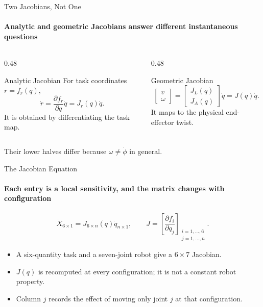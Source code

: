 \documentclass[aspectratio=169]{beamer}
\begin{document}
\begin{frame}[t]{Two Jacobians, Not One}
    \framesubtitle{Analytic and geometric Jacobians answer different instantaneous questions}
    \begin{columns}[T,onlytextwidth]
        \begin{column}{0.48\textwidth}
            \begin{block}{Analytic Jacobian}
                For task coordinates $r=f_r(q)$,
                \[
                    \dot r=\frac{\partial f_r}{\partial q}\dot q
                    =J_r(q)\dot q.
                \]
                It is obtained by differentiating the task map.
            \end{block}
        \end{column}
        \begin{column}{0.48\textwidth}
            \begin{block}{Geometric Jacobian}
                \[
                    \begin{bmatrix}v\\\omega\end{bmatrix}
                    =\begin{bmatrix}J_L(q)\\J_A(q)\end{bmatrix}\dot q
                    =J(q)\dot q.
                \]
                It maps to the physical end-effector twist.
            \end{block}
        \end{column}
    \end{columns}
    Their lower halves differ because $\omega\neq\dot\phi$ in general.
\end{frame}

\begin{frame}[t]{The Jacobian Equation}
    \framesubtitle{Each entry is a local sensitivity, and the matrix changes with configuration}
    \[
        \dot X_{6\times1}=J_{6\times n}(q)\dot q_{n\times1},
        \qquad
        J=\left[\frac{\partial f_i}{\partial q_j}\right]_{
        \substack{i=1,\ldots,6\\j=1,\ldots,n}}.
    \]
    \begin{itemize}
        \item A six-quantity task and a seven-joint robot give a $6\times7$ Jacobian.
        \item $J(q)$ is recomputed at every configuration; it is not a constant robot property.
        \item Column $j$ records the effect of moving only joint $j$ at that configuration.
    \end{itemize}
\end{frame}
\end{document}
